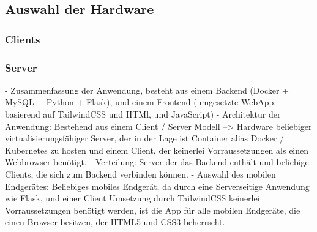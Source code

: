 \subsection{Auswahl der Hardware}
\subsubsection{Clients}
\subsubsection{Server}

- Zusammenfassung der Anwendung, besteht aus einem Backend (Docker + MySQL + Python + Flask), und einem Frontend (umgesetzte WebApp, basierend auf TailwindCSS und HTMl, und JavaScript)
- Architektur der Anwendung: Bestehend aus einem Client / Server Modell --> Hardware beliebiger virtualisierungsfähiger Server, der in der Lage ist Container alias Docker / Kubernetes  zu hosten und einem Client, der keinerlei Vorraussetzungen als einen Webbrowser benötigt.
- Verteilung: Server der das Backend enthält und beliebige Clients, die sich zum Backend verbinden können.
- Auswahl des mobilen Endgerätes: Beliebiges mobiles Endgerät, da durch eine Serverseitige Anwendung wie Flask, und einer Client Umsetzung durch TailwindCSS keinerlei Vorraussetzungen benötigt werden, ist die App für alle mobilen Endgeräte, die einen Browser besitzen, der HTML5 und CSS3 beherrscht.
